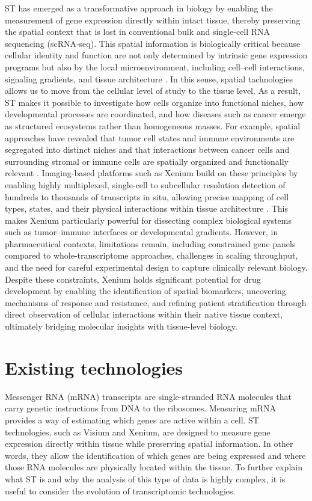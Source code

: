 ST has emerged as a transformative approach in biology by enabling the measurement of gene expression directly within intact tissue, thereby preserving the spatial context that is lost in conventional bulk and single-cell RNA sequencing (scRNA-seq)\cite{Cameron.G.W}. This spatial information is biologically critical because cellular identity and function are not only determined by intrinsic gene expression programs but also by the local microenvironment, including cell–cell interactions, signaling gradients, and tissue architecture \cite{Han-Eol.Park}. In this sense, spatial tachnologies allows us to move from the cellular level of study to the tissue level. As a result, ST makes it possible to investigate how cells organize into functional niches, how developmental processes are coordinated, and how diseases such as cancer emerge as structured ecosystems rather than homogeneous masses. For example, spatial approaches have revealed that tumor cell states and immune environments are segregated into distinct niches and that interactions between cancer cells and surrounding stromal or immune cells are spatially organized and functionally relevant \cite{Mengyi.Liu}. Imaging-based platforms such as Xenium build on these principles by enabling highly multiplexed, single-cell to subcellular resolution detection of hundreds to thousands of transcripts in situ, allowing precise mapping of cell types, states, and their physical interactions within tissue architecture \cite{Hyun.Ju.Lim}. This makes Xenium particularly powerful for dissecting complex biological systems such as tumor–immune interfaces or developmental gradients. However, in pharmaceutical contexts, limitations remain, including constrained gene panels compared to whole-transcriptome approaches, challenges in scaling throughput, and the need for careful experimental design to capture clinically relevant biology. Despite these constraints, Xenium holds significant potential for drug development by enabling the identification of spatial biomarkers, uncovering mechanisms of response and resistance, and refining patient stratification through direct observation of cellular interactions within their native tissue context, ultimately bridging molecular insights with tissue-level biology.

\section{Existing technologies}
Messenger RNA (mRNA) transcripts are single-stranded RNA molecules that carry genetic instructions from DNA to the ribosomes. Measuring mRNA provides a way of estimating which genes are active within a cell. ST technologies, such as Visium and Xenium, are designed to measure gene expression directly within tissue while preserving spatial information. In other words, they allow the identification of which genes are being expressed and where those RNA molecules are physically located within the tissue. To further explain what ST is and why the analysis of this type of data is highly complex, it is useful to consider the evolution of transcriptomic technologies.

